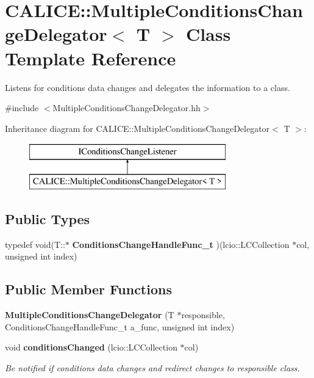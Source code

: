 \section{C\-A\-L\-I\-C\-E\-:\-:Multiple\-Conditions\-Change\-Delegator$<$ T $>$ Class Template Reference}
\label{classCALICE_1_1MultipleConditionsChangeDelegator}


Listens for conditions data changes and delegates the information to a class.  




{\ttfamily \#include $<$Multiple\-Conditions\-Change\-Delegator.\-hh$>$}

Inheritance diagram for C\-A\-L\-I\-C\-E\-:\-:Multiple\-Conditions\-Change\-Delegator$<$ T $>$\-:\begin{figure}[H]
\begin{center}
\leavevmode
\includegraphics[height=2.000000cm]{classCALICE_1_1MultipleConditionsChangeDelegator}
\end{center}
\end{figure}
\subsection*{Public Types}
\begin{DoxyCompactItemize}
\item 
typedef void(T\-::$\ast$ {\bfseries Conditions\-Change\-Handle\-Func\-\_\-t} )(lcio\-::\-L\-C\-Collection $\ast$col, unsigned int index)\label{classCALICE_1_1MultipleConditionsChangeDelegator_af8e908739880440829d0055c2ec360fa}

\end{DoxyCompactItemize}
\subsection*{Public Member Functions}
\begin{DoxyCompactItemize}
\item 
{\bfseries Multiple\-Conditions\-Change\-Delegator} (T $\ast$responsible, Conditions\-Change\-Handle\-Func\-\_\-t a\-\_\-func, unsigned int index)\label{classCALICE_1_1MultipleConditionsChangeDelegator_a90c159262e4f9ef11d0c3ede5d90516c}

\item 
void {\bf conditions\-Changed} (lcio\-::\-L\-C\-Collection $\ast$col)
\begin{DoxyCompactList}\small\item\em Be notified if conditions data changes and redirect changes to responsible class. \end{DoxyCompactList}\end{DoxyCompactItemize}
